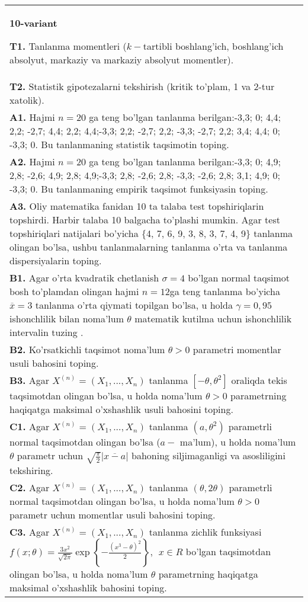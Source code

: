 \documentclass{article}
\begin{document}
\begin{tabular}{m{17cm}}
\textbf{10-variant}
\newline

\textbf{T1.} 
Tanlanma momentleri (\(k -\)tartibli boshlang'ich, boshlang'ich absolyut, markaziy va markaziy absolyut momentler).
\\
\textbf{T2.} 
Statistik gipotezalarni tekshirish (kritik to'plam, 1 va 2-tur xatolik).
\\
\textbf{A1.} 
Hajmi \(n = 20\) ga teng bo'lgan tanlanma berilgan:-3,3; 0; 4,4; 2,2; -2,7; 4,4; 2,2; 4,4;-3,3; 2,2; -2,7; 2,2; -3,3; -2,7; 2,2; 3,4; 4,4; 0; -3,3; 0. Bu tanlanmaning statistik taqsimotin toping.
\\
\textbf{A2.} 
Hajmi \(n = 20\) ga teng bo'lgan tanlanma berilgan:-3,3; 0; 4,9; 2,8; -2,6; 4,9; 2,8; 4,9;-3,3; 2,8; -2,6; 2,8; -3,3; -2,6; 2,8; 3,1; 4,9; 0; -3,3; 0. Bu tanlanmaning empirik taqsimot funksiyasin toping.
\\
\textbf{A3.} 
Oliy matematika fanidan 10 ta talaba test topshiriqlarin topshirdi. Harbir talaba 10 balgacha to'plashi mumkin. Agar test topshiriqlari natijalari bo'yicha \{4, 7, 6, 9, 3, 8, 3, 7, 4, 9\} tanlanma olingan bo'lsa, ushbu tanlanmalarning tanlanma o'rta va tanlanma dispersiyalarin toping.
\\
\textbf{B1.} 
Agar o'rta kvadratik chetlanish \(\sigma = 4\) bo'lgan normal taqsimot bosh to'plamdan olingan hajmi \(n = 12\)ga teng tanlanma bo'yicha \(\overline{x} = 3\) tanlanma o'rta qiymati topilgan bo'lsa, u holda \(\gamma = 0,95\) ishonchlilik bilan noma'lum \(\theta\) matematik kutilma uchun ishonchlilik intervalin tuzing .
\\
\textbf{B2.} 
Ko'rsatkichli taqsimot noma'lum \(\theta > 0\) parametri momentlar usuli bahosini toping.
\\
\textbf{B3.} 
Agar \(X^{(n)} = \left( X_{1},...,X_{n} \right)\) tanlanma \(\left\lbrack - \theta,\theta^{2} \right\rbrack\) oraliqda tekis taqsimotdan olingan bo'lsa, u holda noma'lum \(\theta > 0\) parametrning haqiqatga maksimal o'xshashlik usuli bahosini toping.
\\
\textbf{C1.} 
Agar \(X^{(n)} = \left( X_{1},...,X_{n} \right)\) tanlanma \(\left( a,\theta^{2} \right)\) parametrli normal taqsimotdan olingan bo'lsa (\(a -\) ma'lum), u holda noma'lum \(\theta\) parametr uchun \(\sqrt{\frac{\pi}{2}}\left| \overline{x - a} \right|\) bahoning siljimaganligi va asosliligini tekshiring.
\\
\textbf{C2.} 
Agar \(X^{(n)} = \left( X_{1},...,X_{n} \right)\) tanlanma \((\theta,2\theta)\) parametrli normal taqsimotdan olingan bo'lsa, u holda noma'lum \(\theta > 0\) parametr uchun momentlar usuli bahosini toping.
\\
\textbf{C3.} 
Agar \(X^{(n)} = \left( X_{1},...,X_{n} \right)\) tanlanma zichlik funksiyasi \(f(x;\theta) = \frac{3x^{2}}{\sqrt{2\pi}}\exp\left\{ - \frac{\left( x^{3} - \theta \right)^{2}}{2} \right\},\ \ x \in R\) bo'lgan taqsimotdan olingan bo'lsa, u holda noma'lum \(\theta\) parametrning haqiqatga maksimal o'xshashlik bahosini toping.
\\

\end{tabular}
\vspace{1cm}
\end{document}
